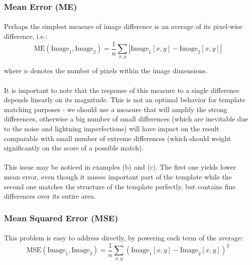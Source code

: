 \subsubsection{Mean Error (ME)}

\paragraph*{}
Perhaps the simplest measure of image difference is an average of its pixel-wise difference, i.e.:
\[
	\mbox{ME}(\mbox{Image}_1,\mbox{Image}_2) = \frac{1}{n} \sum_{x,y} |\mbox{Image}_1[x,y] - \mbox{Image}_2[x,y]|
\]

where $n$ denotes the number of pixels within the image dimensions.

\paragraph*{}
It is important to note that the response of this measure to a single difference depends linearly on its magnitude. This is not an optimal behavior for template matching purposes - we should use a measure that will amplify the strong differences, otherwise a big number of small differences (which are inevitable due to the noise and lightning imperfections) will have impact on the result comparable with small number of extreme differences (which should weight significantly on the score of a possible match).

\paragraph*{}
This issue may be noticed in  examples (b) and (c). The first one yields lower mean error, even though it misses important part of the template while the second one matches the structure of the template perfectly, but contains fine differences over its entire area. 

\subsubsection{Mean Squared Error (MSE)}

\paragraph*{}
This problem is easy to address directly, by powering each term of the average:
\[
	\mbox{MSE}(\mbox{Image}_1,\mbox{Image}_2) = \frac{1}{n} \sum_{x,y} (\mbox{Image}_1[x,y] - \mbox{Image}_2[x,y])^2
\]

